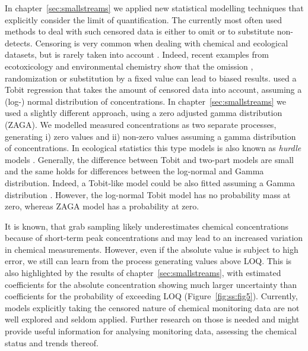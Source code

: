 In chapter~\ref{sec:smallstreams} we applied new statistical modelling techniques that explicitly consider the limit of quantification.
The currently most often used methods to deal with such censored data is either to omit or to substitute non-detects. 
Censoring is very common when dealing with chemical and ecological datasets, but is rarely taken into account \citep{fox_ecological_2015}. 
Indeed, recent examples from ecotoxicology and environmental chemistry show that the omission \citep{hansen_re-evaluation_2015}, randomization \citep{goulson_neonicotinoids_2015} or substitution by a fixed value \citep{helsel_much_2010, helsel_fabricating_2006} can lead to biased results.
\citet{hansen_re-evaluation_2015} used a Tobit regression \citep{tobin_estimation_1958} that takes the amount of censored data into account, assuming a (log-) normal distribution of concentrations.
In chapter~\ref{sec:smallstreams} we used a slightly different approach, using a zero adjusted gamma distribution (ZAGA).
We modelled measured concentrations as two separate processes, generating i) zero values and ii) non-zero values assuming a gamma distribution of concentrations.
In ecological statistics this type models is also known as \emph{hurdle} models \citep{martin_zero_2005}. 
Generally, the difference between Tobit and two-part models are small \citep{min_modeling_2002} and the same holds for differences between the log-normal and Gamma distribution. 
Indeed, a Tobit-like model could be also fitted assuming a Gamma distribution \citep{sigrist_using_2010}.
However, the log-normal Tobit model has no probability mass at zero, whereas ZAGA model has a probability at zero. 

It is known, that grab sampling likely underestimates chemical concentrations because of short-term peak concentrations \citep{xing_influences_2013, stehle_probabilistic_2013} and may lead to an increased variation in chemical measurements.
However, even if the absolute value is subject to high error, we still can learn from the process generating values above LOQ.
This is also highlighted by the results of chapter~\ref{sec:smallstreams}, with estimated coefficients for the absolute concentration showing much larger uncertainty than coefficients for the probability of exceeding LOQ (Figure~\ref{fig:ss:fig5}). 
Currently, models explicitly taking the censored nature of chemical monitoring data are not well explored and seldom applied.
Further research on those is needed and might provide useful information for analysing monitoring data, assessing the chemical status and trends thereof.



